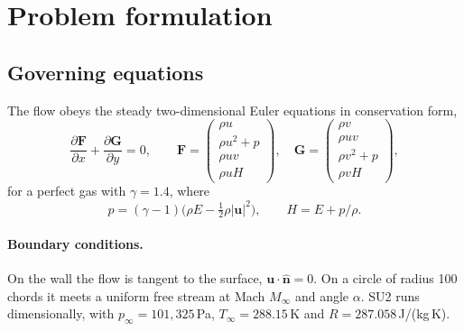 \documentclass[11pt]{article}
\newcommand{\Ma}{M_\infty}
\newcommand{\vu}{\bm{u}}
\begin{document}
\section{Problem formulation}
\label{sec:problem}

\subsection{Governing equations}

The flow obeys the steady two-dimensional Euler equations in conservation form,
\begin{equation}
  \frac{\partial \bm F}{\partial x} + \frac{\partial \bm G}{\partial y} = 0,\qquad
  \bm F = \begin{pmatrix}\rho u\\ \rho u^2 + p\\ \rho u v\\ \rho u H\end{pmatrix},\quad
  \bm G = \begin{pmatrix}\rho v\\ \rho u v\\ \rho v^2 + p\\ \rho v H\end{pmatrix},
  \label{eq:euler}
\end{equation}
for a perfect gas with $\gamma = 1.4$, where
\begin{equation}
  p = (\gamma-1)\bigl(\rho E - \tfrac12\rho|\vu|^2\bigr),\qquad H = E + p/\rho .
\end{equation}

\paragraph{Boundary conditions.}
On the wall the flow is tangent to the surface, $\vu\cdot\hat{\bm n} = 0$. On a circle of radius
100 chords it meets a uniform free stream at Mach $\Ma$ and angle $\alpha$. SU2 runs dimensionally,
with $p_\infty = 101{,}325$\,Pa, $T_\infty = 288.15$\,K and $R = 287.058$\,J/(kg\,K).
\end{document}
